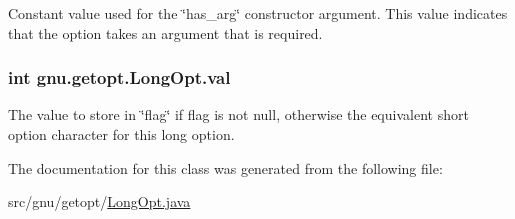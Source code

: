 \label{classgnu_1_1getopt_1_1_long_opt_a8105c98436b46a0b4de39a3afab230c2}
Constant value used for the \char`\"{}has\_\-arg\char`\"{} constructor argument. This value indicates that the option takes an argument that is required. \hypertarget{classgnu_1_1getopt_1_1_long_opt_aee56b4420df0cbd0f69788c7e4a3c57a}{
\subsubsection[{val}]{\setlength{\rightskip}{0pt plus 5cm}int {\bf gnu.getopt.LongOpt.val}}}
\label{classgnu_1_1getopt_1_1_long_opt_aee56b4420df0cbd0f69788c7e4a3c57a}
The value to store in \char`\"{}flag\char`\"{} if flag is not null, otherwise the equivalent short option character for this long option. 

The documentation for this class was generated from the following file:\begin{DoxyCompactItemize}
\item 
src/gnu/getopt/\hyperlink{_long_opt_8java}{LongOpt.java}\end{DoxyCompactItemize}
